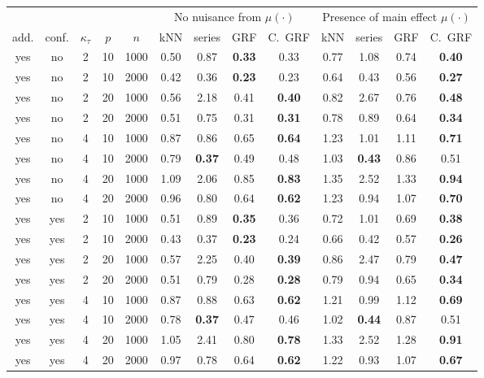 \begin{tabular}{||cc||ccc||cccc||cccc||}
  \hline
\hline
 & & & & & \multicolumn{4}{c||}{No nuisance from $\mu(\cdot)$} & \multicolumn{4}{c||}{Presence of main effect $\mu(\cdot)$} \\
add. & conf. & $\kappa_\tau$ & $p$ & $n$ & kNN & series & GRF & C.~GRF & kNN & series & GRF & C.~GRF  \\ 
  \hline
\hline
yes & no & 2 & 10 & 1000 & 0.50 & 0.87 & \bf 0.33 & 0.33 & 0.77 & 1.08 & 0.74 & \bf 0.40 \\
  yes & no & 2 & 10 & 2000 & 0.42 & 0.36 & \bf 0.23 & 0.23 & 0.64 & 0.43 & 0.56 & \bf 0.27 \\
  yes & no & 2 & 20 & 1000 & 0.56 & 2.18 & 0.41 & \bf 0.40 & 0.82 & 2.67 & 0.76 & \bf 0.48 \\
  yes & no & 2 & 20 & 2000 & 0.51 & 0.75 & 0.31 & \bf 0.31 & 0.78 & 0.89 & 0.64 & \bf 0.34 \\
   \hline
yes & no & 4 & 10 & 1000 & 0.87 & 0.86 & 0.65 & \bf 0.64 & 1.23 & 1.01 & 1.11 & \bf 0.71 \\
  yes & no & 4 & 10 & 2000 & 0.79 & \bf 0.37 & 0.49 & 0.48 & 1.03 & \bf 0.43 & 0.86 & 0.51 \\
  yes & no & 4 & 20 & 1000 & 1.09 & 2.06 & 0.85 & \bf 0.83 & 1.35 & 2.52 & 1.33 & \bf 0.94 \\
  yes & no & 4 & 20 & 2000 & 0.96 & 0.80 & 0.64 & \bf 0.62 & 1.23 & 0.94 & 1.07 & \bf 0.70 \\
   \hline
yes & yes & 2 & 10 & 1000 & 0.51 & 0.89 & \bf 0.35 & 0.36 & 0.72 & 1.01 & 0.69 & \bf 0.38 \\
  yes & yes & 2 & 10 & 2000 & 0.43 & 0.37 & \bf 0.23 & 0.24 & 0.66 & 0.42 & 0.57 & \bf 0.26 \\
  yes & yes & 2 & 20 & 1000 & 0.57 & 2.25 & 0.40 & \bf 0.39 & 0.86 & 2.47 & 0.79 & \bf 0.47 \\
  yes & yes & 2 & 20 & 2000 & 0.51 & 0.79 & 0.28 & \bf 0.28 & 0.79 & 0.94 & 0.65 & \bf 0.34 \\
   \hline
yes & yes & 4 & 10 & 1000 & 0.87 & 0.88 & 0.63 & \bf 0.62 & 1.21 & 0.99 & 1.12 & \bf 0.69 \\
  yes & yes & 4 & 10 & 2000 & 0.78 & \bf 0.37 & 0.47 & 0.46 & 1.02 & \bf 0.44 & 0.87 & 0.51 \\
  yes & yes & 4 & 20 & 1000 & 1.05 & 2.41 & 0.80 & \bf 0.78 & 1.33 & 2.52 & 1.28 & \bf 0.91 \\
  yes & yes & 4 & 20 & 2000 & 0.97 & 0.78 & 0.64 & \bf 0.62 & 1.22 & 0.93 & 1.07 & \bf 0.67 \\

\end{tabular}
